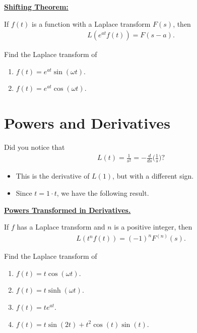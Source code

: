 \documentclass[12pt,a4paper]{article}
\newcounter{example}[section]
\begin{document}
	\underline{\textbf{Shifting Theorem:}}
	
	If $f(t)$ is a function with a Laplace transform $F(s)$, then
		\begin{align*}
		L(e^{at} f(t)) = F(s - a) .
		\end{align*}
		
	\vspace*{16pt}
	
	\begin{example}
	Find the Laplace transform of
	\begin{multicols}{2}
		\begin{enumerate}[label=\textbf{(\alph*)}]
		\item $f(t) = e^{at} \sin (\omega t )$.
		\item $f(t) = e^{at} \cos (\omega t)$.
		\end{enumerate}
	\end{multicols}
	\end{example}
	
	\newpage
	
	\section{Powers and Derivatives}
	Did you notice that
		\begin{align*}
		L (t) = \frac{1}{s^2} = - \frac{d}{ds} \Big( \frac{1}{s} \Big) ?
		\end{align*}
	\begin{itemize}
	\item This is the derivative of $L(1)$, but with a different sign.
	\item Since $t = 1 \cdot t$, we have the following result.
	\end{itemize}
	
	\vspace*{16pt}
	
	\underline{\textbf{Powers Transformed in Derivatives.}}
	
	If $f$ has a Laplace transform and $n$ is a positive integer, then
		\begin{align*}
		L (t^n f(t)) = (-1)^n F^{(n)} (s) .
		\end{align*}
		
	\vspace*{16pt}
	
	\begin{example}
	Find the Laplace transform of
		\begin{multicols}{2}
		\begin{enumerate}[label=\textbf{(\alph*)}]
		\item $f(t) = t \cos (\omega t) $.
		\item $f(t) = t \sinh (\omega t )$.
		\item $f(t) = t e^{at}$.
		\item $f(t) = t \sin (2t ) + t^2 \cos (t) \sin (t)$.
		\end{enumerate}
		\end{multicols}
	\end{example}
	
\end{document}
